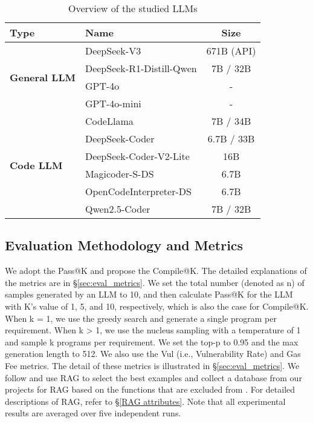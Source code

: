 \begin{table}[htbp]
    \centering
    \caption{Overview of the studied LLMs}
    \resizebox{0.8\linewidth}{!}
    {
        \begin{tabular}{llc}
        \toprule
        \textbf{Type} & \textbf{Name} & \textbf{Size} \\
        \midrule
        \multirow{4}[0]{*}{\textbf{General LLM}}& DeepSeek-V3 & 671B (API) \\
        & DeepSeek-R1-Distill-Qwen & 7B / 32B  \\
        & GPT-4o & - \\
        & GPT-4o-mini & - \\
        \midrule
        \multirow{6}[0]{*}{\textbf{Code LLM}} & CodeLlama & 7B / 34B \\
        & DeepSeek-Coder & 6.7B / 33B \\
        & DeepSeek-Coder-V2-Lite & 16B \\
        & Magicoder-S-DS & 6.7B \\
        & OpenCodeInterpreter-DS & 6.7B \\
        & Qwen2.5-Coder & 7B / 32B \\
        \bottomrule
        \end{tabular}
    }
  \label{tab:studied_llm}
\end{table}


\subsection{Evaluation Methodology and Metrics}
We adopt the Pass@K and propose the Compile@K. 
The detailed explanations of the metrics are in \S\ref{sec:eval_metrics}.
We set the total number (denoted as n) of samples generated by an LLM to 10, and then calculate Pass@K for the LLM with K’s value of 1, 5, and 10, respectively, which is also the case for Compile@K.
When k = 1, we use the greedy search and generate a single program per requirement. 
When k > 1, we use the nucleus sampling with a temperature of 1 and sample k programs per requirement.
We set the top-p to 0.95 and the max generation length to 512.
We also use the Vul (i.e., Vulnerability Rate) and Gas Fee metrics.
The detail of these metrics is illustrated in \S\ref{sec:eval_metrics}.
We follow \citet{parvez2021retrieval,chen2024code,yin2024thinkrepair} and use RAG to select the best examples and collect a database from our projects for RAG based on the functions that are excluded from \mytitle. 
For detailed descriptions of RAG, refer to \S\ref{RAG attributes}. Note that all experimental results are averaged over five independent runs. 